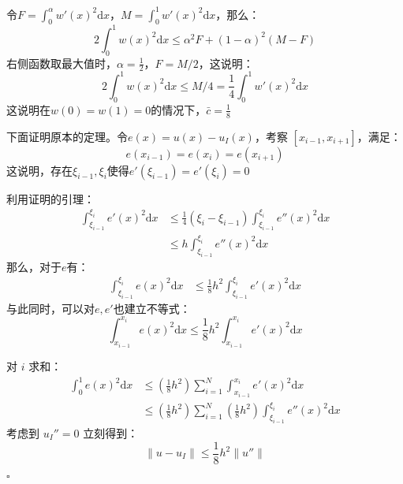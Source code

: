 \documentclass[11pt]{ctexart}
\begin{document}
令$F = \int_0^{\alpha} w'(x)^2\mathrm dx$，$M = \int_0^{1} w'(x)^2\mathrm dx$，那么：
\begin{equation}
  2\int_0^1 w(x)^2 \mathrm dx \le \alpha^2 F + (1 - \alpha)^2 (M-F)
\end{equation}
右侧函数取最大值时，$\alpha = \frac{1}{2}$，$F = M /2$，这说明：
\begin{equation}
  2\int_0^1 w(x)^2 \mathrm dx \le M/4 = \frac{1}{4}\int_0^1 w'(x)^2\mathrm dx
\end{equation}
这说明在$w(0) = w(1) = 0$的情况下，$\bar c = \frac{1}{8}$

下面证明原本的定理。令$e(x) = u(x) - u_I(x)$，考察 $[x_{i-1}, x_{i+1}]$，满足：
\begin{equation}
  e(x_{i-1}) = e(x_i) = e(x_{i+1})
\end{equation}
这说明，存在$\xi_{i-1}, \xi_{i}$使得$e'(\xi_{i-1})=e'(\xi_{i}) = 0$

利用证明的引理：
\begin{equation}
  \begin{aligned}
    \int_{\xi_{i-1}}^{\xi_i} e'(x)^2 \mathrm dx &\le \frac{1}{4} (\xi_{i}-\xi_{i-1})\int_{\xi_{i-1}}^{\xi_i} e''(x)^2 \mathrm dx\\
    &\le h\int_{\xi_{i-1}}^{\xi_i} e''(x)^2 \mathrm dx
  \end{aligned}
\end{equation}
那么，对于$e$有：
\begin{equation}
  \begin{aligned}
    \int_{\xi_{i-1}}^{\xi_i} e(x)^2 \mathrm dx &\le \frac{1}{8} h^2\int_{\xi_{i-1}}^{\xi_i} e'(x)^2 \mathrm dx
  \end{aligned}
\end{equation}
与此同时，可以对$e, e'$也建立不等式：
\begin{equation}
  \int_{x_{i-1}}^{x_i} e(x)^2 \mathrm dx \le \frac{1}{8} h^2\int_{x_{i-1}}^{x_i} e'(x)^2 \mathrm dx
\end{equation}

对 $i$ 求和：
\begin{equation}
  \begin{aligned}
    \int_0^1 e(x)^2 \mathrm dx &\le (\frac{1}{8}h^2) 
    \sum_{i=1}^N\int_{x_{i-1}}^{x_i} e'(x)^2\mathrm dx\\
    &\le(\frac{1}{8}h^2) \sum_{i=1}^N(\frac{1}{8}h^2) \int_{\xi_{i-1}}^{\xi_i} e''(x)^2\mathrm dx
  \end{aligned}
\end{equation}
考虑到 $u_I'' = 0$ 立刻得到：
\begin{equation}
  \| u - u_I \| \le\frac{1}{8}  h^2 \| u'' \|
\end{equation}

\begin{flushright}
  $\square$
\end{flushright}
\end{document}
